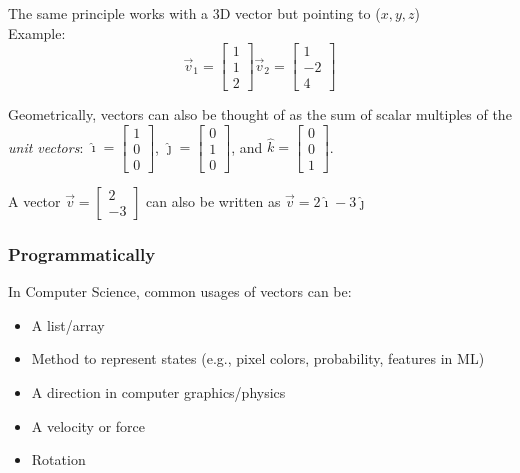 \documentclass[12pt]{report}
\newcommand{\ihat}{\hat{\imath}}
\newcommand{\jhat}{\hat{\jmath}}
\newcommand{\khat}{\hat{k}}
\begin{document}
            The same principle works with a 3D vector but pointing to ($x, y, z$) \\
            Example:
            \begin{equation}
                \vec{v}_1 = \begin{bmatrix} 1 \\ 1 \\ 2 \end{bmatrix}
                \vec{v}_2 = \begin{bmatrix} 1 \\ -2 \\ 4 \end{bmatrix}
            \end{equation}

            Geometrically, vectors can also be thought of as the sum of scalar multiples of the \emph{unit vectors}: $\ihat = \begin{bmatrix}
                1 \\ 0 \\ 0
            \end{bmatrix}$, $\jhat = \begin{bmatrix}
                0 \\ 1 \\ 0
            \end{bmatrix}$, and $\khat = \begin{bmatrix}
                0 \\ 0 \\ 1
            \end{bmatrix}$.

            A vector $\vec{v} = \begin{bmatrix}
                2 \\ -3
            \end{bmatrix}$ can also be written as $\vec{v} = 2\ihat - 3\jhat$

        \subsubsection{Programmatically}
            In Computer Science, common usages of vectors can be:
            \begin{itemize}
                \item A list/array
                \item Method to represent states (e.g., pixel colors, probability, features in ML)
                \item A direction in computer graphics/physics
                \item A velocity or force
                \item Rotation
            \end{itemize}
\end{document}
